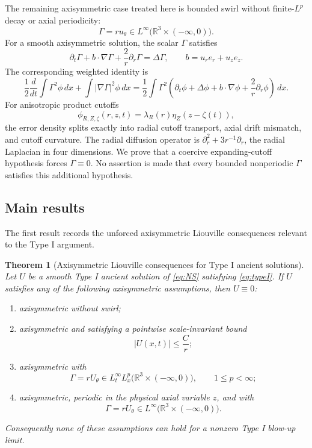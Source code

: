 \documentclass[11pt]{amsart}
\theoremstyle{plain}
\newtheorem{theorem}{Theorem}[section]
\theoremstyle{definition}
\theoremstyle{remark}
\numberwithin{equation}{section}
\begin{document}
The remaining axisymmetric case treated here is bounded swirl without
finite-\(L^p\) decay or axial periodicity:
\[
   \Gamma=ru_\theta\in L^\infty
      \bigl(\mathbb R^3\times(-\infty,0)\bigr).
\]
For a smooth axisymmetric solution, the scalar \(\Gamma\) satisfies
\begin{equation}\label{eq:intro-gamma}
   \partial_t\Gamma+b\cdot\nabla\Gamma+\frac2r\partial_r\Gamma
   =
   \Delta\Gamma,
   \qquad
   b=u_re_r+u_ze_z .
\end{equation}
The corresponding weighted identity is
\begin{equation}\label{eq:intro-gamma-identity}
   \frac12\frac{d}{dt}\int\Gamma^2\phi\,dx
   +
   \int|\nabla\Gamma|^2\phi\,dx
   =
   \frac12\int\Gamma^2
   \left(
      \partial_t\phi+\Delta\phi+b\cdot\nabla\phi+\frac2r\partial_r\phi
   \right)\,dx .
\end{equation}
For anisotropic product cutoffs
\[
   \phi_{R,Z,\zeta}(r,z,t)=\lambda_R(r)\eta_Z(z-\zeta(t)),
\]
the error density splits exactly into radial cutoff transport, axial drift
mismatch, and cutoff curvature.  The radial diffusion operator is
\(\partial_r^2+3r^{-1}\partial_r\), the radial Laplacian in four dimensions.
We prove that a coercive expanding-cutoff hypothesis forces
\(\Gamma\equiv0\).  No assertion is made that every bounded nonperiodic
\(\Gamma\) satisfies this additional hypothesis.

\subsection{Main results}

The first result records the unforced axisymmetric Liouville consequences
relevant to the Type I argument.

\begin{theorem}[Axisymmetric Liouville consequences for Type I ancient solutions]
\label{thm:axisymmetric-liouville}
Let \(U\) be a smooth Type I ancient solution of \eqref{eq:NS} satisfying
\eqref{eq:typeI}.  If \(U\) satisfies any of the following axisymmetric
assumptions, then \(U\equiv0\):
\begin{enumerate}[label=\textup{(\roman*)}]
\item axisymmetric without swirl;
\item axisymmetric and satisfying a pointwise scale-invariant bound
\[
   |U(x,t)|\le \frac{C}{r};
\]
\item axisymmetric with
\[
   \Gamma=rU_\theta\in L_t^\infty L_x^p
   \bigl(\mathbb R^3\times(-\infty,0)\bigr),
   \qquad 1\le p<\infty;
\]
\item axisymmetric, periodic in the physical axial variable \(z\), and with
\[
   \Gamma=rU_\theta\in L^\infty
   \bigl(\mathbb R^3\times(-\infty,0)\bigr).
\]
\end{enumerate}
Consequently none of these assumptions can hold for a nonzero Type I blow-up
limit.
\end{theorem}
\end{document}
